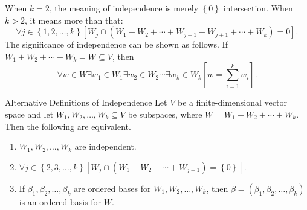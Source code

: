 \documentclass[linearalgebraII]{subfiles}
\begin{document}
    \begin{remark}
        When $k=2$, the meaning of independence is merely $\left\lbrace 0 \right\rbrace$ intersection. When $k>2$, it means more than that:
        \begin{equation*}
            \forall j\in \left\lbrace 1, 2, \ldots, k \right\rbrace \left[ W_j\cap \left( W_1+W_2+\cdots+W_{j-1}+W_{j+1}+\cdots+W_k \right) = 0 \right].
        \end{equation*}
        The significance of independence can be shown as follows. If $W_1+W_2+\cdots+W_k=W\subseteq V$, then
        \begin{equation*}
            \forall w\in W\exists w_1\in W_1\exists w_2\in W_2\cdots\exists w_k\in W_k \left[ w = \sum^{k}_{i=1} w_i \right].
        \end{equation*}
    \end{remark}

    \begin{lemma}{Alternative Definitions of Independence}
        Let $V$ be a finite-dimensional vector space and let $W_1, W_2, \ldots, W_k\subseteq V$ be subspaces, where $W = W_1+W_2+\cdots+W_k$. Then the following are equivalent.
        \begin{enumerate}
            \item $W_1, W_2, \ldots, W_k$ are independent.
            \item $\forall j\in \left\lbrace 2, 3, \ldots, k \right\rbrace \left[ W_j\cap \left( W_1+W_2+\cdots+W_{j-1} \right) = \left\lbrace 0 \right\rbrace  \right]$.
            \item If $\beta_1, \beta_2, \ldots, \beta_k$ are ordered bases for $W_1, W_2, \ldots, W_k$, then $\beta = \left( \beta_1, \beta_2, \ldots, \beta_k \right)$ is an ordered basis for $W$.
        \end{enumerate}
    \end{lemma}
\end{document}
